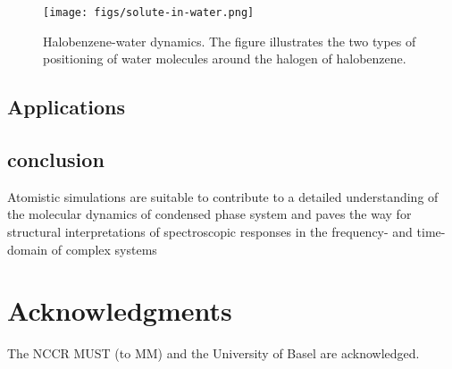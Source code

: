 \documentclass[journal=jacsat,manuscript=article]{achemso}
\begin{document}
\begin{figure}
\texttt{[image: figs/solute-in-water.png]}
\caption{Halobenzene-water dynamics. The figure illustrates the two
  types of positioning of water molecules around the halogen of
  halobenzene.}
\label{fig:solute}
\end{figure}




\subsection{Applications}
%   
%   
%   
%   
%   
%

\subsection{conclusion}
Atomistic simulations are suitable to contribute to a detailed
understanding of the molecular dynamics of condensed phase system and
paves the way for structural interpretations of spectroscopic
responses in the frequency- and time-domain of complex systems

\section*{Acknowledgments}
The NCCR MUST (to MM) and the University of Basel are acknowledged.



\end{document}
